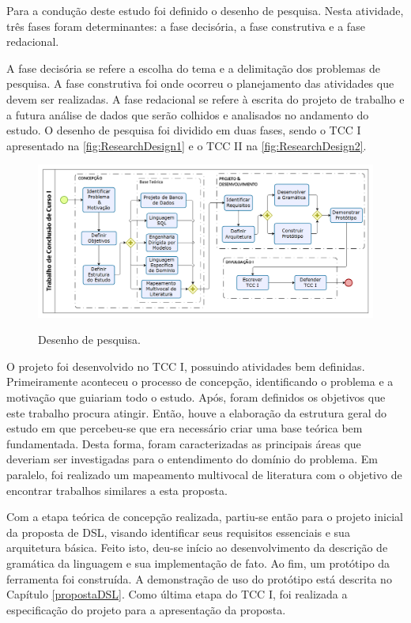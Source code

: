 Para a condução deste estudo foi definido o desenho de pesquisa. 
Nesta atividade, três fases foram determinantes: a fase decisória, a fase construtiva e a fase redacional.

A fase decisória se refere a escolha do tema e a delimitação dos problemas de pesquisa. 
A fase construtiva foi onde ocorreu o planejamento das atividades que devem ser realizadas. 
A fase redacional se refere à escrita do projeto de trabalho e a futura análise de dados que serão colhidos e analisados no andamento do estudo. O desenho de pesquisa foi dividido em duas fases, sendo o \ac{TCC} I apresentado na \autoref{fig:ResearchDesign1} e o \ac{TCC} II na \autoref{fig:ResearchDesign2}.

\begin{figure}[!htb]
	\centering
	\caption{Desenho de pesquisa.}
		\includegraphics[width=1\textwidth]{img/DesenhoPesquisa1.png}
	\label{fig:ResearchDesign1}
\end{figure}

O projeto foi desenvolvido no \ac{TCC} I, possuindo atividades bem definidas. 
Primeiramente aconteceu o processo de concepção, identificando o problema e a motivação que guiariam todo o estudo. 
Após, foram definidos os objetivos que este trabalho procura atingir. 
Então, houve a elaboração da estrutura geral do estudo em que percebeu-se que era necessário criar uma base teórica bem fundamentada. 
Desta forma, foram caracterizadas as principais áreas que deveriam ser investigadas para o entendimento do domínio do problema. 
Em paralelo, foi realizado um mapeamento multivocal de literatura com o objetivo de encontrar trabalhos similares a esta proposta. 

Com a etapa teórica de concepção realizada, partiu-se então para o projeto inicial da proposta de \ac{DSL}, visando identificar seus requisitos essenciais e sua arquitetura básica. 
Feito isto, deu-se início ao desenvolvimento da descrição de gramática da linguagem e sua implementação de fato. 
Ao fim, um protótipo da ferramenta foi construída. 
A demonstração de uso do protótipo está descrita no Capítulo \autoref{propostaDSL}. 
Como última etapa do \ac{TCC} I, foi realizada a especificação do projeto para a apresentação da proposta.

